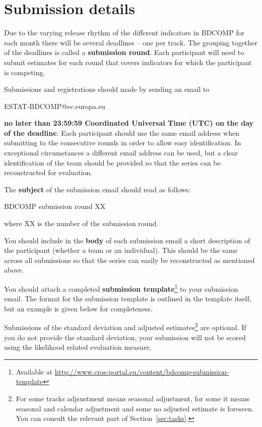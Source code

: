 \documentclass[12pt]{article}
\begin{document}
\newpage
\section{Submission details}
\label{sec:details}

Due to the varying release rhythm of the different indicators in BDCOMP for each month there will be several deadlines – one per track. The grouping together of the deadlines is called a \textbf{submission round}. Each participant will need to submit estimates for each round that covers indicators for which the participant is competing.

Submissions and registrations should made by sending an email to 

ESTAT-BDCOMP@ec.europa.eu

\textbf{no later than 23:59:59 Coordinated Universal Time (UTC) on the day of the deadline}. Each participant should use the same email address when submitting to the consecutive rounds in order to allow easy identification. In exceptional circumstances a different email address can be used, but a clear identification of the team should be provided so that the series can be reconstructed for evaluation.

The \textbf{subject} of the submission email should read as follows:

BDCOMP submission round XX

where XX is the number of the submission round.

You should include in the \textbf{body} of each submission email a short description of the participant (whether a team or an individual). This should be the same across all submissions so that the series can easily be reconstructed as mentioned above.

You should attach a completed \textbf{submission template}\footnote{Available at \url{http://www.cros-portal.eu/content/bdcomp-submission-template}} to your submission email. The format for the submission template is outlined in the template itself, but an example is given below for completeness.

Submissions of the standard deviation and adjusted estimates\footnote{For some tracks adjsustment means seasonal adjustment, for some it means seasonal and calendar adjustment and some no adjusted estimate is foreseen. You can consult the relevant part of Section~\ref{sec:tasks}.} are optional. If you do not provide the standard deviation, your submission will not be scored using the likelihood related evaluation measure. 
\end{document}
